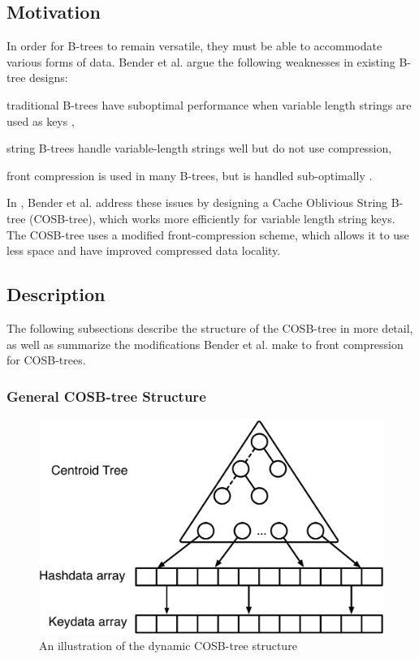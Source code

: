 \documentclass[preprint]{style}
\begin{document}
\subsection{Motivation}

In order for B-trees to remain versatile, they must be able to accommodate
various forms of data. Bender et al. argue the following weaknesses in
existing B-tree designs: 
\begin{inparaenum}[(a)]
  \item traditional B-trees have suboptimal performance when variable length
  strings are used as keys \cite{BenderDemainColton},
  \item string B-trees \cite{Ferragina98} handle variable-length strings well
  but do not use compression, 
  \item front compression \cite{BayerUn77,ClarkSaSt69,Comer79,Wagner73} is used
  in many B-trees, but is handled sub-optimally \cite{BenderFaKu06}. 
\end{inparaenum} 

In \cite{BenderFaKu06}, Bender et al. address these issues by designing a Cache
Oblivious String B-tree (COSB-tree), which works more efficiently
for variable length string keys. The COSB-tree uses a modified front-compression
scheme, which allows it to use less space and have improved
compressed data locality.

\subsection{Description}
The following subsections describe the structure of the COSB-tree in more detail,
as well as summarize the modifications Bender et al. make to front compression
for COSB-trees.
\subsubsection{General COSB-tree Structure}


\begin{figure}
\begin{center}
	\includegraphics[width=\columnwidth]{figures/COSB-treegeneralstructurediagram.pdf}
\end{center}
\caption{An illustration of the dynamic COSB-tree structure}
\label{fig:string_structure}
\end{figure}
\end{document}
